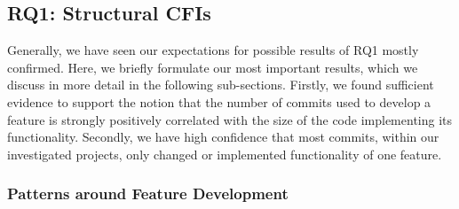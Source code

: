 \subsection*{\textbf{RQ1: Structural CFIs}}\label{sec:disc_struc_cfis}

Generally, we have seen our expectations for possible results of RQ1 mostly confirmed.
Here, we briefly formulate our most important results, which we discuss in more detail in the following sub-sections.
Firstly, we found sufficient evidence to support the notion that the number of commits used to develop a feature is strongly positively correlated with the size of the code implementing its functionality. 
Secondly, we have high confidence that most commits, within our investigated projects, only changed or implemented functionality of one feature.

\subsubsection*{Patterns around Feature Development}

